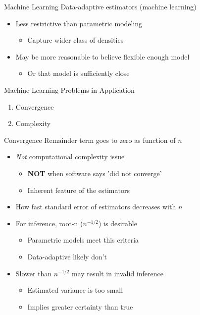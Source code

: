 \documentclass{beamer}
\begin{document}
\begin{frame}{Machine Learning}
	Data-adaptive estimators (machine learning)
	\begin{itemize}
		\item Less restrictive than parametric modeling
		\begin{itemize}
			\item Capture wider class of densities
		\end{itemize}
		\item May be more reasonable to believe flexible enough model
		\begin{itemize}
			\item Or that model is sufficiently close
		\end{itemize}
	\end{itemize}
\end{frame}

\begin{frame}{Machine Learning}
	\large
	Problems in Application
	\begin{enumerate}
		\item Convergence
		\item Complexity
	\end{enumerate}
\end{frame}

\begin{frame}{Convergence}
	Remainder term goes to zero as function of $n$
	\begin{itemize}
		\item \textit{Not} computational complexity issue
		\begin{itemize}
			\item \textbf{NOT} when software says 'did not converge'
			\item Inherent feature of the estimators
		\end{itemize}
		\item How fast standard error of estimators decreases with $n$
		\item For inference, root-n ($n^{-1/2}$) is desirable
		\begin{itemize}
			\item Parametric models meet this criteria
			\item Data-adaptive likely don't
		\end{itemize}
		\item Slower than $n^{-1/2}$ may result in invalid inference
		\begin{itemize}
			\item Estimated variance is too small
			\item Implies greater certainty than true
		\end{itemize}
	\end{itemize}
\end{frame}
\end{document}
